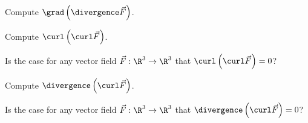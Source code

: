 \documentclass{ximera}
\begin{document}
\begin{exercise}
  Compute \(\grad \left( \divergence \vec{F}\right)\).
  \begin{multipleChoice}
  \end{multipleChoice}
\end{exercise}

\begin{exercise}
  Compute \(\curl \left( \curl \vec{F}\right)\).
  \begin{multipleChoice}
  \end{multipleChoice}

  \begin{exercise}
    Is the case for any vector field $\vec{F} : \R^3 \to \R^3$ that  \(\curl \left( \curl \vec{F}\right) = 0\)?

    \begin{multipleChoice}
    \end{multipleChoice}    
  \end{exercise}
\end{exercise}

\begin{exercise}
  Compute \(\divergence \left( \curl \vec{F}\right)\).
  \begin{multipleChoice}
  \end{multipleChoice}
  
  \begin{exercise}
    Is the case for any vector field $\vec{F} : \R^3 \to \R^3$ that  \(\divergence \left( \curl \vec{F}\right) = 0\)?
    
    \begin{multipleChoice}
    \end{multipleChoice}    
  \end{exercise}
\end{exercise}
\end{document}
